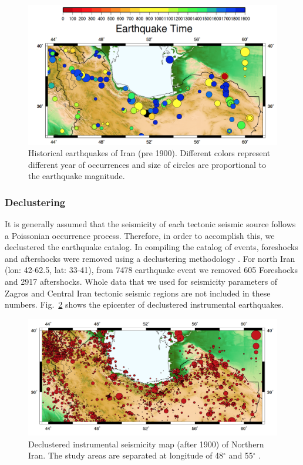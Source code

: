 \begin{figure}[!ht] 

\centering
\includegraphics[scale=0.4]{figures/pdf/Figure2.pdf} 
\caption{Historical earthquakes of Iran (pre 1900). Different colors represent different year of occurrences and size of circles are proportional to the earthquake magnitude. }
\label{fig:historical}
\end{figure}


\subsubsection{Declustering}

It is generally assumed that the seismicity of each tectonic seismic source follows a Poissonian occurrence process. Therefore, in order to accomplish this, we declustered the earthquake catalog. In compiling the catalog of events, foreshocks and aftershocks were removed using a declustering methodology \citep{Gardner1974}. For north Iran (lon: 42-62.5, lat: 33-41), from 7478 earthquake event we removed 605 Foreshocks and 2917 aftershocks.
Whole data that we used for seismicity parameters of Zagros and Central Iran tectonic seismic regions are not included in these numbers. Fig.~\ref{fig:instrumental} shows the epicenter of declustered instrumental  earthquakes.


\begin{figure}[!ht] 

\centering
\includegraphics[scale=0.25]{figures/pdf/Figure3.pdf} 
\caption{Declustered instrumental seismicity map (after 1900) of Northern Iran. The study areas are separated at longitude of 48$^{\circ}$ and 55$^{\circ}$ . } 
\label{fig:instrumental}
\end{figure}



